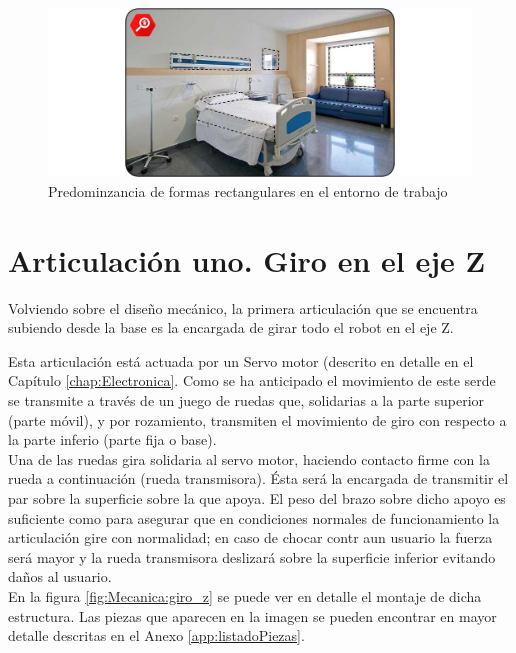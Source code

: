     \begin{figure}[H]
        \centering
        \includegraphics[width=\textwidth]{figuras/Imagenes_Mecanica/verdad_de_formas.jpg}
        \caption{Predominzancia de formas rectangulares en el entorno de trabajo}
        \label{fig:Mecanica:verdad_formas}
    \end{figure}

\section{Articulación uno. Giro en el eje Z} \label{sec:Mecanica:articulacion_uno}

    Volviendo sobre el diseño mecánico, la primera articulación que se encuentra subiendo desde la base es la encargada de girar todo el robot en el eje Z.

    Esta articulación está actuada por un Servo motor (descrito en detalle en el Capítulo \ref{chap:Electronica}. Como se ha anticipado el movimiento de este serde se transmite a través de un juego de ruedas que, solidarias a la parte superior (parte móvil), y por rozamiento, transmiten el movimiento de giro con respecto a la parte inferio (parte fija o base).
    \\

    Una de las ruedas gira solidaria al servo motor, haciendo contacto firme con la rueda a continuación (rueda transmisora). Ésta será la encargada de transmitir el par sobre la superficie sobre la que apoya. El peso del brazo sobre dicho apoyo es suficiente como para asegurar que en condiciones normales de funcionamiento la articulación gire con normalidad; en caso de chocar contr aun usuario la fuerza será mayor y la rueda transmisora deslizará sobre la superficie inferior evitando daños al usuario.
	\\
	En la figura \ref{fig:Mecanica:giro_z} se puede ver en detalle el montaje de dicha estructura. Las piezas que aparecen en la imagen se pueden encontrar en mayor detalle descritas en el Anexo \ref{app:listadoPiezas}.

